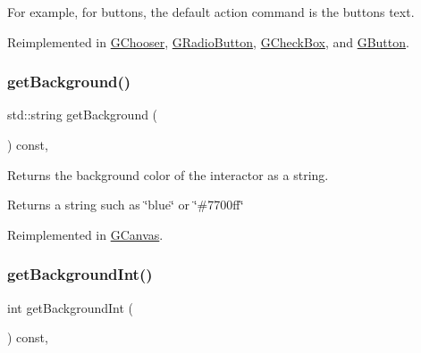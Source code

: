 For example, for buttons, the default action command is the button\textquotesingle{}s text. 

Reimplemented in \mbox{\hyperlink{classGChooser_a90f2b1e6f6e7dabd9d6e5307f7c6d1b7}{G\+Chooser}}, \mbox{\hyperlink{classGRadioButton_a90f2b1e6f6e7dabd9d6e5307f7c6d1b7}{G\+Radio\+Button}}, \mbox{\hyperlink{classGCheckBox_a90f2b1e6f6e7dabd9d6e5307f7c6d1b7}{G\+Check\+Box}}, and \mbox{\hyperlink{classGButton_a90f2b1e6f6e7dabd9d6e5307f7c6d1b7}{G\+Button}}.

\mbox{\label{classGInteractor_a808e22cc1fdfbecf71ed8c64ef4600e0}} 
\subsubsection{\texorpdfstring{get\+Background()}{getBackground()}}
{\footnotesize\ttfamily std\+::string get\+Background (\begin{DoxyParamCaption}{ }\end{DoxyParamCaption}) const\hspace{0.3cm}{\ttfamily [virtual]}, {\ttfamily [inherited]}}



Returns the background color of the interactor as a string. 

\begin{DoxyReturn}{Returns}
a string such as \char`\"{}blue\char`\"{} or \char`\"{}\#7700ff\char`\"{} 
\end{DoxyReturn}


Reimplemented in \mbox{\hyperlink{classGCanvas_ab44f928b6bd7c8e4b82d5ed92bc3d4c6}{G\+Canvas}}.

\mbox{\label{classGInteractor_a9e827257a55cb8cf4d9de2ec6bcfd7a0}} 
\subsubsection{\texorpdfstring{get\+Background\+Int()}{getBackgroundInt()}}
{\footnotesize\ttfamily int get\+Background\+Int (\begin{DoxyParamCaption}{ }\end{DoxyParamCaption}) const\hspace{0.3cm}{\ttfamily [virtual]}, {\ttfamily [inherited]}}



